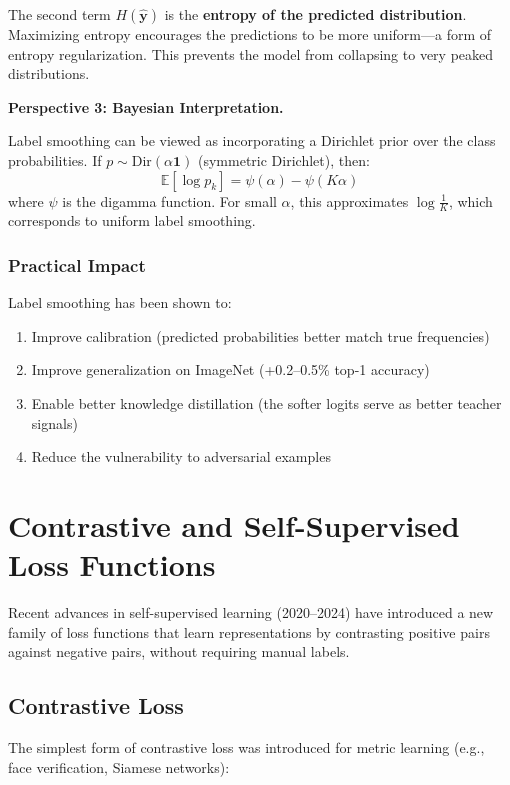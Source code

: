 The second term $H(\hat{\mathbf{y}})$ is the \textbf{entropy of the predicted distribution}. Maximizing entropy encourages the predictions to be more uniform---a form of entropy regularization. This prevents the model from collapsing to very peaked distributions.

\textbf{Perspective 3: Bayesian Interpretation.}

Label smoothing can be viewed as incorporating a Dirichlet prior over the class probabilities. If $p \sim \text{Dir}(\alpha \mathbf{1})$ (symmetric Dirichlet), then:
\begin{equation}
\mathbb{E}[\log p_k] = \psi(\alpha) - \psi(K\alpha)
\end{equation}
where $\psi$ is the digamma function. For small $\alpha$, this approximates $\log \frac{1}{K}$, which corresponds to uniform label smoothing.

\subsubsection{Practical Impact}

Label smoothing has been shown to:
\begin{enumerate}
    \item Improve calibration (predicted probabilities better match true frequencies)
    \item Improve generalization on ImageNet (+0.2--0.5\% top-1 accuracy)
    \item Enable better knowledge distillation (the softer logits serve as better teacher signals)
    \item Reduce the vulnerability to adversarial examples
\end{enumerate}

\section{Contrastive and Self-Supervised Loss Functions}

Recent advances in self-supervised learning (2020--2024) have introduced a new family of loss functions that learn representations by contrasting positive pairs against negative pairs, without requiring manual labels.

\subsection{Contrastive Loss}

The simplest form of contrastive loss was introduced for metric learning (e.g., face verification, Siamese networks):

